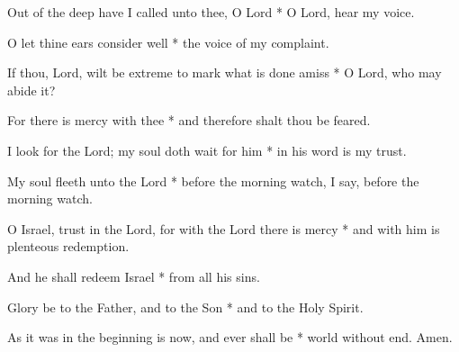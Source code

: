 Out of the deep have I called unto thee, O Lord * O Lord, hear my voice.

O let thine ears consider well * the voice of my complaint.
	
If thou, Lord, wilt be extreme to mark what is done amiss * O Lord, who may abide it?
	
For there is mercy with thee * and therefore shalt thou be feared.
	
I look for the Lord; my soul doth wait for him * in his word is my trust.
	
My soul fleeth unto the Lord * before the morning watch, I say, before the morning watch.
	
O Israel, trust in the Lord, for with the Lord there is mercy * and with him is plenteous redemption.
	
And he shall redeem Israel * from all his sins.
	
Glory be to the Father, and to the Son * and to the Holy Spirit.
	
As it was in the beginning is now, and ever shall be * world without end. Amen.